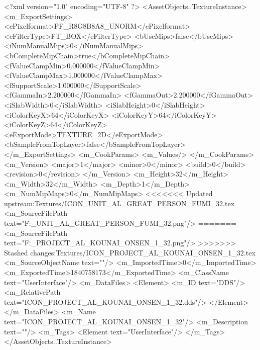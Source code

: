 <?xml version="1.0" encoding="UTF-8" ?>
<AssetObjects..TextureInstance>
	<m_ExportSettings>
		<ePixelformat>PF_R8G8B8A8_UNORM</ePixelformat>
		<eFilterType>FT_BOX</eFilterType>
		<bUseMips>false</bUseMips>
		<iNumManualMips>0</iNumManualMips>
		<bCompleteMipChain>true</bCompleteMipChain>
		<fValueClampMin>0.000000</fValueClampMin>
		<fValueClampMax>1.000000</fValueClampMax>
		<fSupportScale>1.000000</fSupportScale>
		<fGammaIn>2.200000</fGammaIn>
		<fGammaOut>2.200000</fGammaOut>
		<iSlabWidth>0</iSlabWidth>
		<iSlabHeight>0</iSlabHeight>
		<iColorKeyX>64</iColorKeyX>
		<iColorKeyY>64</iColorKeyY>
		<iColorKeyZ>64</iColorKeyZ>
		<eExportMode>TEXTURE_2D</eExportMode>
		<bSampleFromTopLayer>false</bSampleFromTopLayer>
	</m_ExportSettings>
	<m_CookParams>
		<m_Values/>
	</m_CookParams>
	<m_Version>
		<major>1</major>
		<minor>0</minor>
		<build>0</build>
		<revision>0</revision>
	</m_Version>
	<m_Height>32</m_Height>
	<m_Width>32</m_Width>
	<m_Depth>1</m_Depth>
	<m_NumMipMaps>0</m_NumMipMaps>
<<<<<<< Updated upstream:Textures/ICON_UNIT_AL_GREAT_PERSON_FUMI_32.tex
	<m_SourceFilePath text="F:\DT\lilyimages\gpportrait\ICON_UNIT_AL_GREAT_PERSON_FUMI_32.png"/>
=======
	<m_SourceFilePath text="F:\DT\lilyimages\projects\ICON_PROJECT_AL_KOUNAI_ONSEN_1_32.png"/>
>>>>>>> Stashed changes:Textures/ICON_PROJECT_AL_KOUNAI_ONSEN_1_32.tex
	<m_SourceObjectName text=""/>
	<m_ImportedTime>0</m_ImportedTime>
	<m_ExportedTime>1840758173</m_ExportedTime>
	<m_ClassName text="UserInterface"/>
	<m_DataFiles>
		<Element>
			<m_ID text="DDS"/>
			<m_RelativePath text="ICON_PROJECT_AL_KOUNAI_ONSEN_1_32.dds"/>
		</Element>
	</m_DataFiles>
	<m_Name text="ICON_PROJECT_AL_KOUNAI_ONSEN_1_32"/>
	<m_Description text=""/>
	<m_Tags>
		<Element text="UserInterface"/>
	</m_Tags>
</AssetObjects..TextureInstance>

